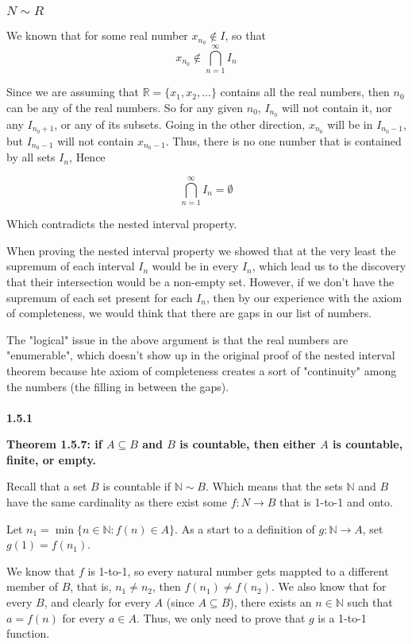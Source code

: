 \subsubsection{$N \sim R$}

We known that for some real number $x_{n_0} \notin I$, so that
$$
x_{n_0} \notin \bigcap^{\infty}_{n=1} I_n
$$

Since we are assuming that $\mathbb{R} = \{ x_1, x_2, ... \}$ contains all the real numbers,
then $n_0$ can be any of the real numbers.
So for any given $n_0$, $I_{n_0}$ will not contain it, nor any $I_{n_0+1}$, or any of its subsets.
Going in the other direction, $x_{n_0}$ will be in $I_{n_0 - 1}$, but
$I_{n_0 - 1}$ will not contain $x_{n_0-1}$.
Thus, there is no one number that is contained by all sets $I_n$, Hence

$$
\bigcap^{\infty}_{n=1} I_n = \emptyset
$$

Which contradicts the nested interval property.

When proving the nested interval property we showed that at the very least the supremum of each interval $I_n$
would be in every $I_n$, which lead us to the discovery that their intersection would be a non-empty set.
However, if we don't have the supremum of each set present for each $I_n$, then by our experience with the axiom
of completeness, we would think that there are gaps in our list of numbers.

The "logical" issue in the above argument is that the real numbers are "enumerable", which doesn't show up in the original
proof of the nested interval theorem because hte axiom of completeness creates a sort of "continuity" among the numbers
(the filling in between the gaps).
\\~\\


\textbf{1.5.1}

\textbf{Theorem 1.5.7: if $A \subseteq B$ and $B$ is countable, then either $A$ is countable, finite, or empty.}

Recall that a set $B$ is countable if $\mathbb{N} \sim B$.
Which means that the sets $\mathbb{N}$ and $B$ have the same cardinality as there exist some $f : N \rightarrow B$
that is 1-to-1 and onto.

Let $n_1 = \min \{ n \in \mathbb{N} : f(n) \in A \}$.
As a start to a definition of $g: \mathbb{N} \rightarrow A$, set $g(1) = f(n_1)$.

We know that $f$ is 1-to-1, so every natural number gets mappted to a different member of $B$, that is, $n_1 \neq n_2$, then
$f(n_1) \neq f(n_2)$.
We also know that for every $B$, and clearly for every $A$ (since $A \subseteq B$), there exists an $n \in \mathbb{N}$
such that $a = f(n)$ for every $a \in A$.
Thus, we only need to prove that $g$ is a 1-to-1 function.


